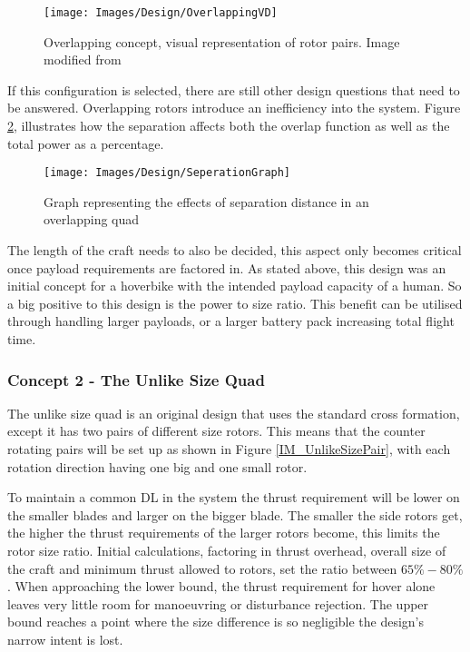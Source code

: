 			\begin{figure}[H]
			\centering
			\texttt{[image: Images/Design/OverlappingVD]}
			\caption{Overlapping concept, visual representation of rotor pairs. Image modified from \cite{MAHover}}
			\label{IM_OverlappingPair}
			\end{figure}
			If this configuration is selected, there are still other design questions that need to be answered. Overlapping rotors introduce an inefficiency into the system. Figure \ref{IM_SeperationGraph}, illustrates how the separation affects both the overlap function as well as the total power as a percentage.
			\begin{figure}[]
			\centering
			\texttt{[image: Images/Design/SeperationGraph]}
			\caption{Graph representing the effects of separation distance in an overlapping quad}
			\label{IM_SeperationGraph}
			\end{figure}
			The length of the craft needs to also be decided, this aspect only becomes critical once payload requirements are factored in. As stated above, this design was an initial concept for a hoverbike with the intended payload capacity of a human. So a big positive to this design is the power to size ratio. This benefit can be utilised through handling larger payloads, or a larger battery pack increasing total flight time.

			\subsubsection{Concept 2 - The Unlike Size Quad}
			The unlike size quad is an original design that uses the standard cross formation, except it has two pairs of different size rotors. This means that the counter rotating pairs will be set up as shown in Figure \ref{IM_UnlikeSizePair}, with each rotation direction having one big and one small rotor. 
			
			To maintain a common DL in the system the thrust requirement will be lower on the smaller blades and larger on the bigger blade. The smaller the side rotors get, the higher the thrust requirements of the larger rotors become, this limits the rotor size ratio. Initial calculations, factoring in thrust overhead, overall size of the craft and minimum thrust allowed to rotors, set the ratio between $65\% - 80\%$.  When approaching the lower bound, the thrust requirement for hover alone leaves very little room for manoeuvring or disturbance rejection. The upper bound reaches a point where the size difference is so negligible the design's narrow intent is lost.
			
